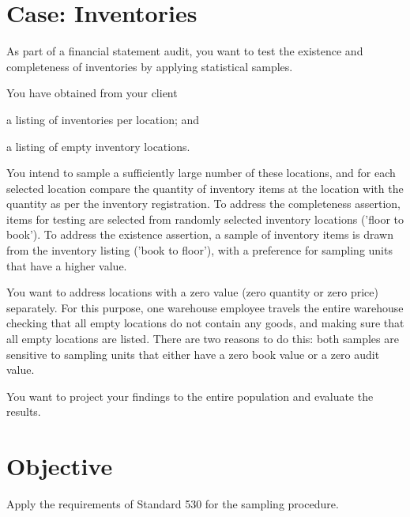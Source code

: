 \documentclass[12pt,a4paper]{memoir}
\begin{document}
\begin{mdframed}[hidealllines=true,backgroundcolor=gray!10, innerleftmargin=0.3cm]
\section*{Case: Inventories}
\RaggedRight

As part of a financial statement audit, you want to test the existence and completeness of inventories by applying statistical samples. 

You have obtained from your client 
\begin{compactitem}
	\item a listing of inventories per location; and
	\item a listing of empty inventory locations.
\end{compactitem}

\bigskip
You intend to sample a sufficiently large number of these locations, and for each selected location compare the quantity of inventory items at the location with the quantity as per the inventory registration. To address the completeness assertion, items for testing are selected from randomly selected inventory locations ('floor to book'). To address the existence assertion, a sample of inventory items is drawn from the inventory listing ('book to floor'), with a preference for sampling units that have a higher value.

You want to address locations with a zero value (zero quantity or zero price) separately. For this purpose, one warehouse employee travels the entire warehouse checking that all empty locations do not contain any goods, and making sure that all empty locations are listed. There are two reasons to do this: both samples are sensitive to sampling units that either have a zero book value or a zero audit value. 

You want to project your findings to the entire population and evaluate the results. 


\section*{Objective}
Apply the requirements of Standard 530 for the sampling procedure.
\end{mdframed}
\end{document}
